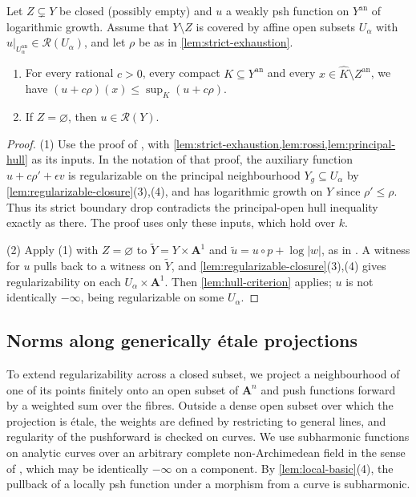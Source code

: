 \documentclass[11pt,a4paper]{article}
\newcommand{\an}{\mathrm{an}}          %
\begin{document}
\begin{proposition}\label{prop:gluing}
Let $Z\subsetneq Y$ be closed \textup(possibly empty\textup) and $u$ a weakly psh function on $Y^{\an}$ of logarithmic growth. Assume that $Y\setminus Z$ is covered by affine open subsets $U_\alpha$ with $u|_{U_\alpha^{\an}}\in\mathcal{R}(U_\alpha)$, and let $\rho$ be as in \cref{lem:strict-exhaustion}.
\begin{enumerate}
\item For every rational $c>0$, every compact $K\subseteq Y^{\an}$ and every $x\in\widehat K\setminus Z^{\an}$, we have $(u+c\rho)(x)\le\sup_K(u+c\rho)$.
\item If $Z=\varnothing$, then $u\in\mathcal{R}(Y)$.
\end{enumerate}
\end{proposition}

\begin{proof}
(1) Use the proof of \cite[Lemma~6.8]{Wu26}, with \cref{lem:strict-exhaustion,lem:rossi,lem:principal-hull} as its inputs. In the notation of that proof, the auxiliary function $u+c\rho'+\epsilon v$ is regularizable on the principal neighbourhood $Y_g\subseteq U_\alpha$ by \cref{lem:regularizable-closure}(3),(4), and has logarithmic growth on $Y$ since $\rho'\le\rho$. Thus its strict boundary drop contradicts the principal-open hull inequality exactly as there. The proof uses only these inputs, which hold over $k$.

(2) Apply (1) with $Z=\varnothing$ to $\widetilde Y=Y\times\mathbf A^1$ and $\widetilde u=u\circ p+\log|w|$, as in \cite[Corollary~6.9]{Wu26}. A witness for $u$ pulls back to a witness on $\widetilde Y$, and \cref{lem:regularizable-closure}(3),(4) gives regularizability on each $U_\alpha\times\mathbf A^1$. Then \cref{lem:hull-criterion} applies; $u$ is not identically $-\infty$, being regularizable on some $U_\alpha$.
\end{proof}

\subsection{Norms along generically \'etale projections}\label{subsec:norms}

To extend regularizability across a closed subset, we project a neighbourhood of one of its points finitely onto an open subset of $\mathbf A^n$ and push functions forward by a weighted sum over the fibres. Outside a dense open subset over which the projection is \'etale, the weights are defined by restricting to general lines, and regularity of the pushforward is checked on curves. We use subharmonic functions on analytic curves over an arbitrary complete non-Archimedean field in the sense of \cite[Definition~3.4]{GublerRabinoff25}, which may be identically $-\infty$ on a component. By \cref{lem:local-basic}(4), the pullback of a locally psh function under a morphism from a curve is subharmonic.
\end{document}
